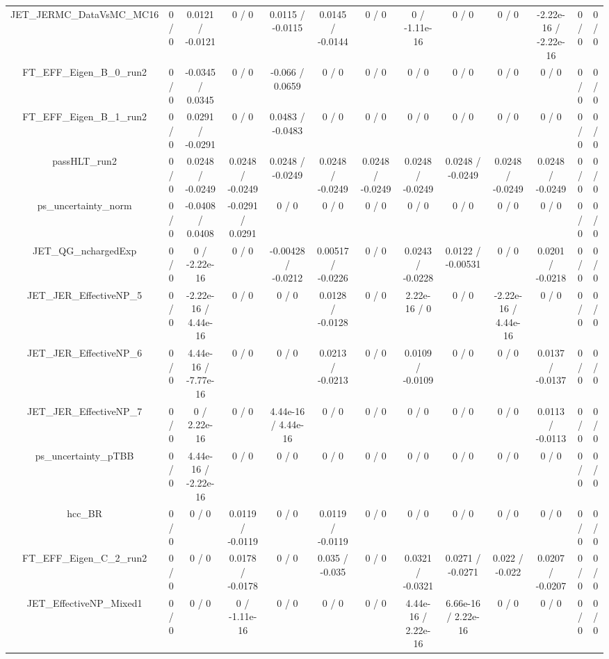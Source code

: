 \documentclass[10pt]{article}
\begin{document}
\begin{table}[htbp]
\begin{center}
\begin{tabular}{|c|c|c|c|c|c|c|c|c|c|c|c|c|}
  JET_JERMC_DataVsMC_MC16 & 0 / 0 & 0.0121 / -0.0121 & 0 / 0 & 0.0115 / -0.0115 & 0.0145 / -0.0144 & 0 / 0 & 0 / -1.11e-16 & 0 / 0 & 0 / 0 & -2.22e-16 / -2.22e-16 & 0 / 0 & 0 / 0 \\ 
  FT_EFF_Eigen_B_0_run2 & 0 / 0 & -0.0345 / 0.0345 & 0 / 0 & -0.066 / 0.0659 & 0 / 0 & 0 / 0 & 0 / 0 & 0 / 0 & 0 / 0 & 0 / 0 & 0 / 0 & 0 / 0 \\ 
  FT_EFF_Eigen_B_1_run2 & 0 / 0 & 0.0291 / -0.0291 & 0 / 0 & 0.0483 / -0.0483 & 0 / 0 & 0 / 0 & 0 / 0 & 0 / 0 & 0 / 0 & 0 / 0 & 0 / 0 & 0 / 0 \\ 
  passHLT_run2 & 0 / 0 & 0.0248 / -0.0249 & 0.0248 / -0.0249 & 0.0248 / -0.0249 & 0.0248 / -0.0249 & 0.0248 / -0.0249 & 0.0248 / -0.0249 & 0.0248 / -0.0249 & 0.0248 / -0.0249 & 0.0248 / -0.0249 & 0 / 0 & 0 / 0 \\ 
  ps_uncertainty_norm & 0 / 0 & -0.0408 / 0.0408 & -0.0291 / 0.0291 & 0 / 0 & 0 / 0 & 0 / 0 & 0 / 0 & 0 / 0 & 0 / 0 & 0 / 0 & 0 / 0 & 0 / 0 \\ 
  JET_QG_nchargedExp & 0 / 0 & 0 / -2.22e-16 & 0 / 0 & -0.00428 / -0.0212 & 0.00517 / -0.0226 & 0 / 0 & 0.0243 / -0.0228 & 0.0122 / -0.00531 & 0 / 0 & 0.0201 / -0.0218 & 0 / 0 & 0 / 0 \\ 
  JET_JER_EffectiveNP_5 & 0 / 0 & -2.22e-16 / 4.44e-16 & 0 / 0 & 0 / 0 & 0.0128 / -0.0128 & 0 / 0 & 2.22e-16 / 0 & 0 / 0 & -2.22e-16 / 4.44e-16 & 0 / 0 & 0 / 0 & 0 / 0 \\ 
  JET_JER_EffectiveNP_6 & 0 / 0 & 4.44e-16 / -7.77e-16 & 0 / 0 & 0 / 0 & 0.0213 / -0.0213 & 0 / 0 & 0.0109 / -0.0109 & 0 / 0 & 0 / 0 & 0.0137 / -0.0137 & 0 / 0 & 0 / 0 \\ 
  JET_JER_EffectiveNP_7 & 0 / 0 & 0 / 2.22e-16 & 0 / 0 & 4.44e-16 / 4.44e-16 & 0 / 0 & 0 / 0 & 0 / 0 & 0 / 0 & 0 / 0 & 0.0113 / -0.0113 & 0 / 0 & 0 / 0 \\ 
  ps_uncertainty_pTBB & 0 / 0 & 4.44e-16 / -2.22e-16 & 0 / 0 & 0 / 0 & 0 / 0 & 0 / 0 & 0 / 0 & 0 / 0 & 0 / 0 & 0 / 0 & 0 / 0 & 0 / 0 \\ 
  hcc_BR & 0 / 0 & 0 / 0 & 0.0119 / -0.0119 & 0 / 0 & 0.0119 / -0.0119 & 0 / 0 & 0 / 0 & 0 / 0 & 0 / 0 & 0 / 0 & 0 / 0 & 0 / 0 \\ 
  FT_EFF_Eigen_C_2_run2 & 0 / 0 & 0 / 0 & 0.0178 / -0.0178 & 0 / 0 & 0.035 / -0.035 & 0 / 0 & 0.0321 / -0.0321 & 0.0271 / -0.0271 & 0.022 / -0.022 & 0.0207 / -0.0207 & 0 / 0 & 0 / 0 \\ 
  JET_EffectiveNP_Mixed1 & 0 / 0 & 0 / 0 & 0 / -1.11e-16 & 0 / 0 & 0 / 0 & 0 / 0 & 4.44e-16 / 2.22e-16 & 6.66e-16 / 2.22e-16 & 0 / 0 & 0 / 0 & 0 / 0 & 0 / 0 \\ 

\end{tabular}
\end{center}
\end{table}
\end{document}
